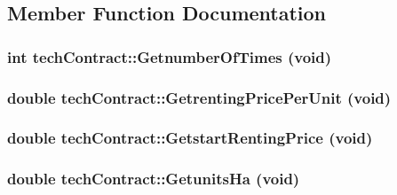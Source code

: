\subsection{Member Function Documentation}
\hypertarget{classtech_contract_a4ba04d5b945a4e9275b0eaa9fbaf75bd}{
\subsubsection[{GetnumberOfTimes}]{\setlength{\rightskip}{0pt plus 5cm}int techContract::GetnumberOfTimes (void)}}
\label{classtech_contract_a4ba04d5b945a4e9275b0eaa9fbaf75bd}
\hypertarget{classtech_contract_a8db21b54fa4302fb87673cdfaadd5a06}{
\subsubsection[{GetrentingPricePerUnit}]{\setlength{\rightskip}{0pt plus 5cm}double techContract::GetrentingPricePerUnit (void)}}
\label{classtech_contract_a8db21b54fa4302fb87673cdfaadd5a06}
\hypertarget{classtech_contract_a115403d337cbbbd223583b5dc689020b}{
\subsubsection[{GetstartRentingPrice}]{\setlength{\rightskip}{0pt plus 5cm}double techContract::GetstartRentingPrice (void)}}
\label{classtech_contract_a115403d337cbbbd223583b5dc689020b}
\hypertarget{classtech_contract_aff7221c0f1f8bcdcd55f4ca03aae1c08}{
\subsubsection[{GetunitsHa}]{\setlength{\rightskip}{0pt plus 5cm}double techContract::GetunitsHa (void)}}
